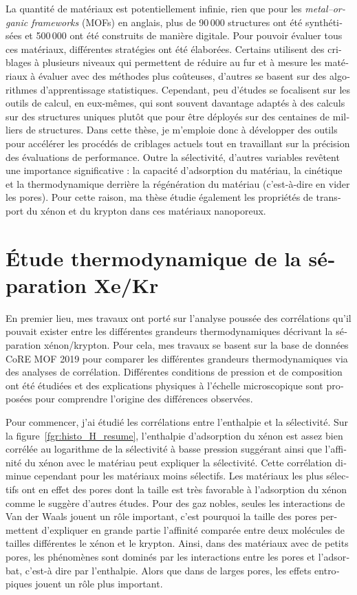 \documentclass[thesis]{subfiles}
\begin{document}
\begin{otherlanguage}{french}
La quantité de matériaux est potentiellement infinie, rien que pour les \emph{metal--organic frameworks} (MOFs) en anglais, plus de 90\,000 structures ont été synthétisées et 500\,000 ont été construits de manière digitale. Pour pouvoir évaluer tous ces matériaux, différentes stratégies ont été élaborées. Certains utilisent des criblages à plusieurs niveaux qui permettent de réduire au fur et à mesure les matériaux à évaluer avec des méthodes plus coûteuses, d'autres se basent sur des algorithmes d'apprentissage statistiques. Cependant, peu d'études se focalisent sur les outils de calcul, en eux-mêmes, qui sont souvent davantage adaptés à des calculs sur des structures uniques plutôt que pour être déployés sur des centaines de milliers de structures. Dans cette thèse, je m'emploie donc à développer des outils pour accélérer les procédés de criblages actuels tout en travaillant sur la précision des évaluations de performance. Outre la sélectivité, d'autres variables revêtent une importance significative : la capacité d'adsorption du matériau, la cinétique et la thermodynamique derrière la régénération du matériau (c'est-à-dire en vider les pores). Pour cette raison, ma thèse étudie également les propriétés de transport du xénon et du krypton dans ces matériaux nanoporeux. 

\section*{\'Etude thermodynamique de la séparation Xe/Kr}

En premier lieu, mes travaux ont porté sur l'analyse poussée des corrélations qu'il pouvait exister entre les différentes grandeurs thermodynamiques décrivant la séparation xénon/krypton. Pour cela, mes travaux se basent sur la base de données CoRE MOF 2019 pour comparer les différentes grandeurs thermodynamiques via des analyses de corrélation. Différentes conditions de pression et de composition ont été étudiées et des explications physiques à l'échelle microscopique sont proposées pour comprendre l'origine des différences observées. 

Pour commencer, j'ai étudié les corrélations entre l'enthalpie et la sélectivité. Sur la figure~\ref{fgr:histo_H_resume}, l'enthalpie d'adsorption du xénon est assez bien corrélée au logarithme de la sélectivité à basse pression suggérant ainsi que l'affinité du xénon avec le matériau peut expliquer la sélectivité. Cette corrélation diminue cependant pour les matériaux moins sélectifs. Les matériaux les plus sélectifs ont en effet des pores dont la taille est très favorable à l'adsorption du xénon comme le suggère d'autres études. Pour des gaz nobles, seules les interactions de Van der Waals jouent un rôle important, c'est pourquoi la taille des pores permettent d'expliquer en grande partie l'affinité comparée entre deux molécules de tailles différentes le xénon et le krypton. Ainsi, dans des matériaux avec de petits pores, les phénomènes sont dominés par les interactions entre les pores et l'adsorbat, c'est-à dire par l'enthalpie. Alors que dans de larges pores, les effets entropiques jouent un rôle plus important.


\end{otherlanguage}
\end{document}
